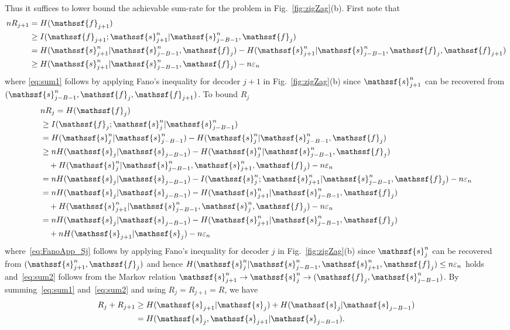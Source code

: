 \documentclass[journal, twocolumn, 10pt]{IEEEtran}
\newcommand{\eps}{\varepsilon}
\newcommand{\rvf}{{\mathssf{f}}}    %
\newcommand{\rvs}{{\mathssf{s}}}    %
\begin{document}
Thus it suffices to lower bound the achievable sum-rate for the problem in Fig.~\ref{fig:zigZag}(b). First note that 
\begin{align}
nR_{j+1}&= H(\rvf_{j+1})\notag\\
&\ge I(\rvf_{j+1} ;\rvs_{j+1}^n | \rvs^n_{j-B-1}, \rvf_{j})\notag\\
&=  H(\rvs_{j+1}^n|\rvs_{j-B-1}^n, \rvf_{j}) -H(\rvs_{j+1}^n|\rvs_{j-B-1}^n, \rvf_{j}, \rvf_{j+1})\notag\\
&\ge H(\rvs_{j+1}^n|\rvs_{j-B-1}^n, \rvf_{j}) - n\eps_n\label{eq:sum1}
\end{align}where \eqref{eq:sum1} follows by applying Fano's inequality for decoder $j+1$ in Fig.~\ref{fig:zigZag}(b) since $\rvs_{j+1}^n$ can be recovered from $(\rvs_{j-B-1}^n, \rvf_{j}, \rvf_{j+1})$. To bound $R_j$
\begin{align}
&nR_{j}= H(\rvf_{j})\notag\\
&\ge I(\rvf_{j};\rvs^n_{j}|\rvs_{j-B-1}^n)\nonumber \\
&= H(\rvs_{j}^n|\rvs_{j-B-1}^n)\notag - H(\rvs_{j}^n|\rvs_{j-B-1}^n, \rvf_{j})\nonumber \\
&\ge nH(\rvs_{j}|\rvs_{j-B-1})- H(\rvs_{j}^n|\rvs_{j-B-1}^n, \rvf_{j}) \notag\\ &\quad +H(\rvs_{j}^n|\rvs_{j-B-1}^n,\rvs_{j+1}^n, \rvf_{j})-n\eps_n\label{eq:FanoApp_Sj}\\
&=nH(\rvs_{j}|\rvs_{j-B-1})  - I(\rvs_{j}^n; \rvs_{j+1}^n |\rvs_{j-B-1}^n, \rvf_{j})-n\eps_n\nonumber\\
&=nH(\rvs_{j}|\rvs_{j-B-1})-H(\rvs_{j+1}^n |\rvs_{j-B-1}^n, \rvf_{j}) \notag\\ &\quad + H( \rvs_{j+1}^n |\rvs_{j-B-1}^n,\rvs_{j}^n, \rvf_{j})-n\eps_n\nonumber\\
&=nH(\rvs_{j}|\rvs_{j-B-1})-H(\rvs_{j+1}^n |\rvs_{j-B-1}^n, \rvf_{j}) \notag\\ &\quad + nH(\rvs_{j+1}|\rvs_j) -n\eps_n\label{eq:sum2}
\end{align}
where~\eqref{eq:FanoApp_Sj} follows by applying Fano's inequality for decoder $j$ in Fig.~\ref{fig:zigZag}(b) since $\rvs_j^n$ can be recovered from $(\rvs_{j+1}^n, \rvf_j)$ and hence $H(\rvs_{j}^n|\rvs_{j-B-1}^n,\rvs_{j+1}^n, \rvf_{j}) \le n\eps_n$ holds and~\eqref{eq:sum2} follows from the Markov relation ${\rvs_{j+1}^n \rightarrow \rvs_j^n \rightarrow (\rvf_j, \rvs_{j-B-1}^n)}$. By summing~\eqref{eq:sum1} and~\eqref{eq:sum2} and using $R_j=R_{j+1}=R$, we have 
\begin{align}
R_{j}+R_{j+1} &\ge H(\rvs_{j+1}|\rvs_{j}) + H(\rvs_{j}|\rvs_{j-B-1}) \\
&= H(\rvs_{j},\rvs_{j+1}|\rvs_{j-B-1})\label{eq:Q2}.
\end{align}
\end{document}
